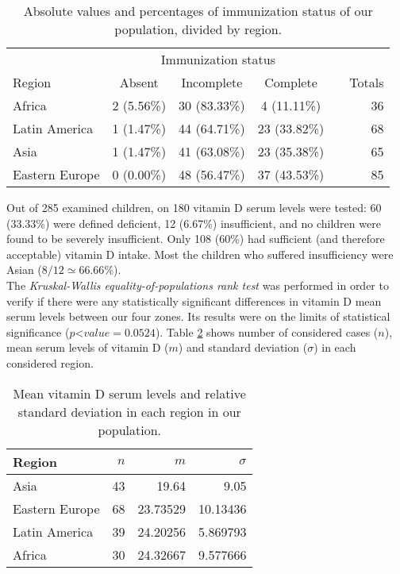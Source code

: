 \begin{table}[H]
   \centering
   \begin{tabular}{l c c c c | r}
   	  & \multicolumn{3}{c}{Immunization status} & \\
   	 \cline{2-4}
      Region\footnotemark[1] & Absent & Incomplete & Complete & & Totals\\
      \hline
      Africa & 2 (5.56\%) & 30 (83.33\%) & 4 (11.11\%) & & 36\\
      Latin America & 1 (1.47\%) & 44 (64.71\%) & 23 (33.82\%) & & 68\\
      Asia & 1 (1.47\%) & 41 (63.08\%) & 23 (35.38\%) & & 65\\
      Eastern Europe & 0 (0.00\%) & 48 (56.47\%) & 37 (43.53\%) & & 85\\
   \end{tabular}
   \caption{Absolute values and percentages of immunization status of our population, divided by region.}
    \label{tab:immunizationperregion}
\end{table}


Out of 285 examined children, on 180 vitamin D serum levels were tested: 60 (33.33\%) were defined deficient, 12 (6.67\%) insufficient, and no children were found to be severely insufficient. Only 108 (60\%) had sufficient (and therefore acceptable) vitamin D intake. Most the children who suffered insufficiency were Asian ($8/12\simeq66.66\%$).\\
The \textit{Kruskal-Wallis equality-of-populations rank test} was performed in order to verify if there were any statistically significant differences in vitamin D mean serum levels between our four zones. Its results were on the limits of statistical significance ($p$\textless$value=0.0524$). Table \ref{tab:vitamindperregion} shows number of considered cases ($n$), mean serum levels of vitamin D ($m$) and standard deviation ($\sigma$) in each considered region.

\begin{table}[H]
   \centering
   \begin{tabular}{l r r r}
      Region\footnotemark[2] & $n$ & $m$ & $\sigma$\\
      \hline
      Asia & 43 & 19.64 & 9.05\\
      Eastern Europe & 68 & 23.73529 & 10.13436\\
      Latin America & 39 & 24.20256 & 5.869793\\
      Africa & 30 & 24.32667 & 9.577666\\
   \end{tabular}
   \caption{Mean vitamin D serum levels and relative standard deviation in each region in our population.}
    \label{tab:vitamindperregion}
\end{table}

